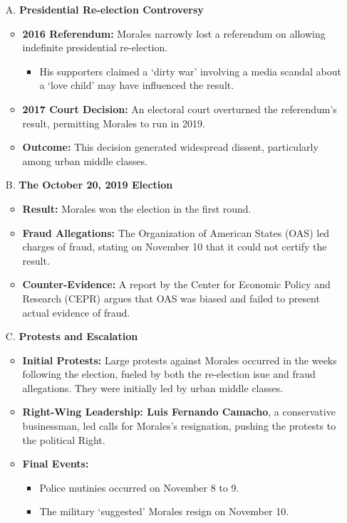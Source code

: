 \documentclass{article}
\begin{document}
    \begin{itemize}
        \item [A.] \textbf{Presidential Re-election Controversy}
        \begin{itemize}
            \item \textbf{2016 Referendum:} Morales narrowly lost a
            referendum on allowing indefinite presidential re-election.
            \begin{itemize}
                \item His supporters claimed a `dirty war' involving a media
                scandal about a `love child' may have influenced the result.
            \end{itemize}
            \item \textbf{2017 Court Decision:} An electoral court
            overturned the referendum's result, permitting Morales to run in
            2019.
            \item \textbf{Outcome:} This decision generated widespread
            dissent, particularly among urban middle classes.
        \end{itemize}
        \item[B.] \textbf{The October 20, 2019 Election}
        \begin{itemize}
            \item \textbf{Result:} Morales won the election in the first round.
            \item \textbf{Fraud Allegations:} The Organization of American
            States (OAS) led charges of fraud, stating on November 10 that
            it could not certify the result.
            \item \textbf{Counter-Evidence:} A report by the Center for
            Economic Policy and Research (CEPR) argues that OAS was biased
            and failed to present actual evidence of fraud.
        \end{itemize}
        \item[C.] \textbf{Protests and Escalation}
        \begin{itemize}
            \item \textbf{Initial Protests:} Large protests against Morales
            occurred in the weeks following the election, fueled by both the
            re-election isue and fraud allegations. They were initially led
            by urban middle classes.
            \item \textbf{Right-Wing Leadership: Luis Fernando Camacho}, a
            conservative businessman, led calls for Morales's resignation,
            pushing the protests to the political Right.
            \item \textbf{Final Events:}
            \begin{itemize}
                \item Police mutinies occurred on November 8 to 9.
                \item The military `suggested' Morales resign on November 10.
            \end{itemize}
        \end{itemize}
    \end{itemize}
\end{document}
